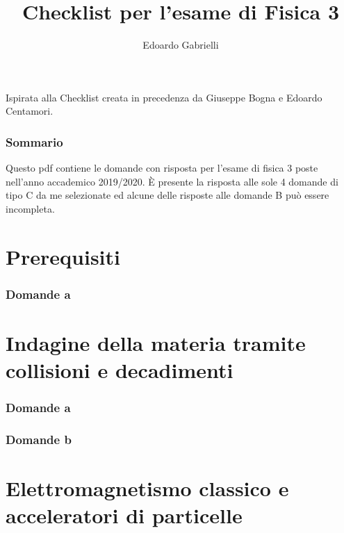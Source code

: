 \documentclass[10pt,a4paper]{article}
\author{Edoardo Gabrielli}
\title{Checklist per l'esame di Fisica 3}
\begin{document}
\maketitle
Ispirata alla Checklist creata in precedenza da Giuseppe Bogna e Edoardo Centamori. 



\section*{\centering Sommario}
Questo pdf contiene le domande con risposta per l'esame di fisica 3 poste nell'anno accademico 2019/2020. È presente la risposta alle sole 4 domande di tipo C da me selezionate ed alcune delle risposte alle domande B può essere incompleta. 

\clearpage

\tableofcontents

\listoffigures
\clearpage


\part{Prerequisiti}
\section{Domande a}


\part{Indagine della materia tramite collisioni e decadimenti}
\setcounter{section}{0}
\renewcommand*{\theHsection}{chX.\the\value{section}}
\section{Domande a}
\section{Domande b}


\part{Elettromagnetismo classico e acceleratori di particelle}
\setcounter{section}{0}
\renewcommand*{\theHsection}{chX.\the\value{section}}
\end{document}
